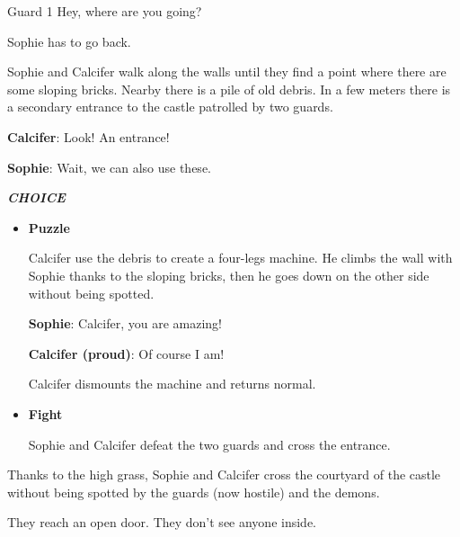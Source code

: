 \begin{screenplay}

\begin{dialogue}{Guard 1}
Hey, where are you going?
\end{dialogue}

Sophie has to go back.

\end{screenplay}
\vspace{1em}


Sophie and Calcifer walk along the walls until they find a point where there are some sloping bricks. Nearby there is a pile of old debris.
In a few meters there is a secondary entrance to the castle patrolled by two guards.

\textbf{Calcifer}: Look! An entrance!

\textbf{Sophie}: Wait, we can also use these.

\textit{\textbf{CHOICE}}
\begin{itemize}
  \item \textbf{Puzzle}
  
  Calcifer use the debris to create a four-legs machine. He climbs the wall with Sophie thanks to the sloping bricks, then he goes down on the other side without being spotted.
  
  \textbf{Sophie}: Calcifer, you are amazing!
  
  \textbf{Calcifer (proud)}: Of course I am!

  Calcifer dismounts the machine and returns normal.

  \item \textbf{Fight}
    
  Sophie and Calcifer defeat the two guards and cross the entrance.
\end{itemize}


Thanks to the high grass, Sophie and Calcifer cross the courtyard of the castle without being spotted by the guards (now hostile) and the demons.

They reach an open door. They don’t see anyone inside.


